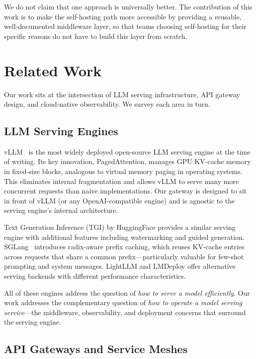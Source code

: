 \documentclass[10pt,journal]{IEEEtran}
\begin{document}
We do not claim that one approach is universally better. The contribution of this work is to make the self-hosting path more accessible by providing a reusable, well-documented middleware layer, so that teams choosing self-hosting for their specific reasons do not have to build this layer from scratch.

\section{Related Work}\label{sec:related}

Our work sits at the intersection of LLM serving infrastructure, API gateway design, and cloud-native observability. We survey each area in turn.

\subsection{LLM Serving Engines}

vLLM~\cite{kwon2023efficient} is the most widely deployed open-source LLM serving engine at the time of writing. Its key innovation, PagedAttention, manages GPU KV-cache memory in fixed-size blocks, analogous to virtual memory paging in operating systems. This eliminates internal fragmentation and allows vLLM to serve many more concurrent requests than naive implementations. Our gateway is designed to sit in front of vLLM (or any OpenAI-compatible engine) and is agnostic to the serving engine's internal architecture.

Text Generation Inference (TGI) by HuggingFace provides a similar serving engine with additional features including watermarking and guided generation. SGLang~\cite{zheng2024sglang} introduces radix-aware prefix caching, which reuses KV-cache entries across requests that share a common prefix---particularly valuable for few-shot prompting and system messages. LightLLM and LMDeploy offer alternative serving backends with different performance characteristics.

All of these engines address the question of \emph{how to serve a model efficiently}. Our work addresses the complementary question of \emph{how to operate a model serving service}---the middleware, observability, and deployment concerns that surround the serving engine.

\subsection{API Gateways and Service Meshes}
\end{document}
